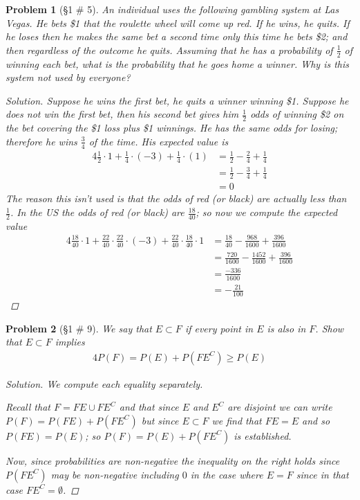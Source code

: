 \documentclass[11pt, oneside]{book}   	%
\newtheorem{problem}{Problem}
\begin{document}
\begin{problem}[\S 1 \# 5]
	An individual uses the following gambling system at Las Vegas. He bets \$1 that the roulette wheel will come up red. If he wins, he quits. If he loses then he makes the same bet a second time only this time he bets \$2; and then regardless of the outcome he quits. Assuming that he has a probability of $\frac{1}{2}$ of winning each bet, what is the probability that he goes home a winner. Why is this system not used by everyone? 
	\begin{proof}[Solution]
		Suppose he wins the first bet, he quits a winner winning \$1. Suppose he does not win the first bet, then his second bet gives him $\frac{1}{2}$ odds of winning \$2 on the bet covering the \$1 loss plus \$1 winnings. He has the same odds for losing; therefore he wins $\frac{3}{4}$ of the time. His expected value is 
		\begin{alignat*}{4}
			\frac{1}{2}\cdot 1 + \frac{1}{4}\cdot (-3) + \frac{1}{4}\cdot (1) &= \frac{1}{2} - \frac{2}{4} + \frac{1}{4} \\
				&=\frac{1}{2} - \frac{3}{4} + \frac{1}{4} \\
				&=0
		\end{alignat*}
		The reason this isn't used is that the odds of red (or black) are actually less than $\frac{1}{2}$. In the US the odds of red (or black) are $\frac{18}{40}$; so now we compute the expected value
		\begin{alignat*}{4}
			\frac{18}{40}\cdot 1 + \frac{22}{40}\cdot\frac{22}{40}\cdot (-3) + \frac{22}{40}\cdot\frac{18}{40} \cdot 1 &=\frac{18}{40}-\frac{968}{1600} + \frac{396}{1600} \\
				&=\frac{720}{1600} - \frac{1452}{1600} + \frac{396}{1600} \\
				&=\frac{-336}{1600} \\
				&=-\frac{21}{100}
		\end{alignat*}
	\end{proof}
\end{problem}

\begin{problem}[\S 1 \# 9]
	We say that $E \subset F$ if every point in $E$ is also in $F$. Show that $E\subset F$ implies 
	\begin{alignat}{4}
		P(F)=P(E) + P\left(FE^C\right) \geq P(E)
	\end{alignat}
	\begin{proof}[Solution]
		We compute each equality separately. 
		
		Recall that $F=FE \cup FE^C$ and that since $E$ and $E^C$ are disjoint we can write $P(F)=P(FE) + P\left(FE^C\right)$ but since $E\subset F$ we find that $FE = E$ and so $P(FE)=P(E)$; so $P(F)=P(E)+P\left(FE^C\right)$ is established. 
		
		Now, since probabilities are non-negative the inequality on the right holds since $P\left(FE^C\right)$ may be non-negative including $0$ in the case where $E=F$ since in that case $FE^C=\emptyset$. 
		
	\end{proof}
\end{problem}
\end{document}
